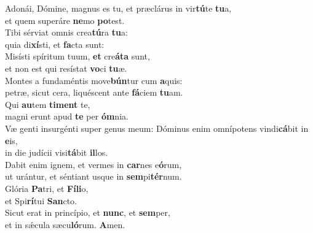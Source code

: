 \evenverse Adonái, Dómine, magnus es tu, et præclárus in vir\textbf{tú}te \textbf{tu}a,~\*\\
\evenverse et quem superáre \textbf{ne}mo \textbf{po}test.\\
\oddverse Tibi sérviat omnis crea\textbf{tú}ra \textbf{tu}a:~\*\\
\oddverse quia di\textbf{xí}sti, et \textbf{fa}cta sunt:\\
\evenverse Misísti spíritum tuum, \textbf{et} cre\textbf{á}\textbf{ta} sunt,~\*\\
\evenverse et non est qui resístat \textbf{vo}ci \textbf{tu}æ.\\
\oddverse Montes a fundaméntis move\textbf{bún}tur cum \textbf{a}quis:~\*\\
\oddverse petræ, sicut cera, liquéscent ante \textbf{fá}ciem \textbf{tu}am.\\
\evenverse Qui \textbf{au}tem \textbf{ti}\textbf{ment} te,~\*\\
\evenverse magni erunt apud \textbf{te} per \textbf{óm}nia.\\
\oddverse Væ genti insurgénti super genus meum: Dóminus enim omnípotens vindi\textbf{cá}bit in \textbf{e}is,~\*\\
\oddverse in die judícii visi\textbf{tá}bit \textbf{il}los.\\
\evenverse Dabit enim ignem, et vermes in \textbf{car}nes e\textbf{ó}rum,~\*\\
\evenverse ut urántur, et séntiant usque in \textbf{sem}pi\textbf{tér}num.\\
\oddverse Glória \textbf{Pa}tri, et \textbf{Fí}\textbf{li}o,~\*\\
\oddverse et Spi\textbf{rí}tui \textbf{San}cto.\\
\evenverse Sicut erat in princípio, et \textbf{nunc}, et \textbf{sem}per,~\*\\
\evenverse et in sǽcula sæcu\textbf{ló}rum. \textbf{A}men.\\
